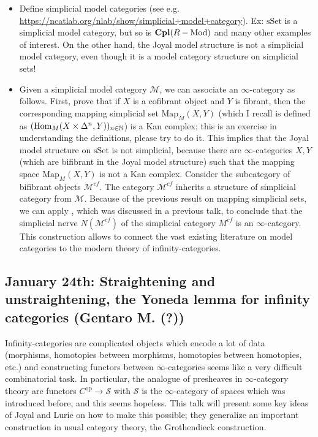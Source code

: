 \documentclass{amsart}
\theoremstyle{definition}
\theoremstyle{remark}
\newcommand{\Hom}{\mathop{\rm Hom}\nolimits}
\newcommand{\ra}{\rightarrow}
\newcommand{\Cpl}{\mathop{\mathbf{Cpl}}\nolimits}
\newcommand{\Mod}{\rm Mod}
\newcommand{\op}{\mathrm{op}}
\newcommand{\sSet}{\mathrm{sSet}}
\begin{document}
\begin{itemize}
\item Define simplicial model categories (see e.g. \url{https://ncatlab.org/nlab/show/simplicial+model+category}). Ex: $\sSet$ is a simplicial model category, but so is $\Cpl(R-\Mod)$ and many other examples of interest. On the other hand, the Joyal model structure is not a simplicial model category, even though it is a model category structure on simplicial sets!
\item Given a simplicial model category $\mathcal{M}$, we can associate an $\infty$-category as follows. First, prove that if $X$ is a cofibrant object and $Y$ is fibrant, then the corresponding mapping simplicial set $\mathrm{Map}_{M}(X,Y)$ (which I recall is defined as $(\Hom_{M}(X\times \Delta^{n},Y))_{n\in\mathbb{N}}$) is a Kan complex; this is an exercise in understanding the definitions, please try to do it. This implies that the Joyal model structure on $\sSet$ is not simplicial, because there are $\infty$-categories $X,Y$ (which are bifibrant in the Joyal model structure) such that the mapping space $\mathrm{Map}_{M}(X,Y)$ is not a Kan complex. Consider the subcategory of bifibrant objects $\mathcal{M}^{cf}$. The category $\mathcal{M}^{cf}$ inherits a structure of simplicial category from $\mathcal{M}$. Because of the previous result on mapping simplicial sets, we can apply \cite[Prop. 1.1.5.10]{HTT}, which was discussed in a previous talk, to conclude that the simplicial nerve $N(\mathcal{M}^{cf})$ of the simplicial category $M^{cf}$ is an $\infty$-category. This construction allows to connect the vast existing literature on model categories to the modern theory of infinity-categories.
\end{itemize}  

\subsection{January 24th: Straightening and unstraightening, the Yoneda lemma for infinity categories (Gentaro M. (?))
}

Infinity-categories are complicated objects which encode a lot of data (morphisms, homotopies between morphisms, homotopies between homotopies, etc.) and constructing functors between $\infty$-categories seems like a very difficult combinatorial task. In particular, the analogue of presheaves in $\infty$-category theory are functors $C^{\op}\ra \mathcal{S}$ with $\mathcal{S}$ is the $\infty$-category of spaces which was introduced before, and this seems hopeless. This talk will present some key ideas of Joyal and Lurie on how to make this possible; they generalize an important construction in usual category theory, the Grothendieck construction.
\end{document}
